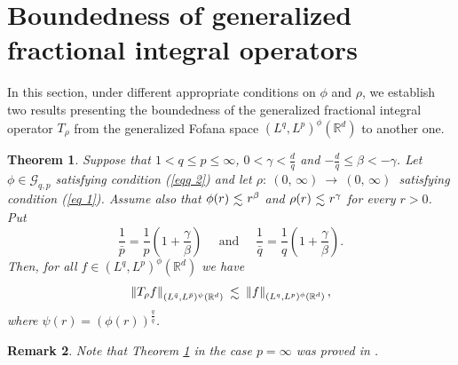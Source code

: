 \documentclass[10pt,a4paper]{amsart}
\numberwithin{equation}{section}
\newtheorem{theorem}{Theorem}[section]
\newtheorem{remark}[theorem]{Remark}
\numberwithin{equation}{section}
\def\lsim{\raisebox{-1ex}{$~\stackrel{\textstyle <}{\sim}~$}}
\begin{document}
\section{Boundedness of generalized fractional integral operators}
\label{S4}
In this section, under different appropriate conditions on $\phi$ and $\rho$, we establish two results presenting the boundedness of the generalized fractional integral operator $T_{\rho}$ from the generalized Fofana space $(L^{q},L^{p})^{\phi}(\mathbb{R}^{d})$ to another one. 
\begin{theorem}\label{theo 3}
Suppose that $1 < q\leq p \leq \infty$, $ 0 < \gamma < \frac{d}{q}$ and $-\frac{d}{q} \leq \beta  < -\gamma $. Let $\phi\in \mathcal{G}_{q,p}$ satisfying condition (\ref{eqq 2}) and let $\rho : \: (0,\,\infty) \:  \to \: (0,\,\infty) \:$ satisfying condition (\ref{eq 1}). Assume also that 
$\phi(r) \lsim  r^{\beta}$ and $\rho(r) \lsim  r^{\gamma}$ for every $r > 0$. \\ Put $$\frac{1}{\bar{p}} = \frac{1}{p}\left(1 +\frac{\gamma}{\beta}\right) \quad \text{ and } \quad \frac{1}{\bar{q}} = \frac{1}{q}\left(1 +\frac{\gamma}{\beta}\right). $$
Then, for all  $f \in (L^{q},L^{p})^{\phi}(\mathbb{R}^{d})$ we have
 $$\left\Vert T_{\rho}f \right\Vert_{(L^{\bar{q}},L^{\bar{p}})^{\psi}(\mathbb{R}^{d})} \lsim  \left\Vert f  \right\Vert_{(L^{q},L^{p})^{\phi}(\mathbb{R}^{d})},$$ where  $\psi(r)= (\phi(r))^{\frac{q}{\bar{q}}}$.
\end{theorem}
\begin{remark}
Note that Theorem \ref{theo 3} in the case $p=\infty$ was proved in \cite[Theorem 2.3]{GE}. 
\end{remark}
\end{document}
